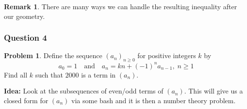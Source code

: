 \documentclass[11pt]{article}
\theoremstyle{definition}
\newtheorem*{problem}{Problem}
\newtheorem*{remark}{Remark}
\begin{document}
\begin{remark}
    There are many ways we can handle the resulting inequality after our geometry.
\end{remark}

\newpage 

\subsubsection{Question 4}

\begin{problem}
    Define the sequence $(a_n)_{n \geq 0}$ for positive integers $k$ by
    \[a_0 = 1 \quad \text{and} \quad a_n = kn + (-1)^n a_{n-1}, \; n \geq 1\]
    Find all $k$ such that $2000$ is a term in $(a_n)$. 
\end{problem}

{\bf Idea:} Look at the subsequences of even/odd terms of $(a_n)$. This will give us a closed form for $(a_n)$ via 
some bash and it is then a number theory problem. 
\end{document}
